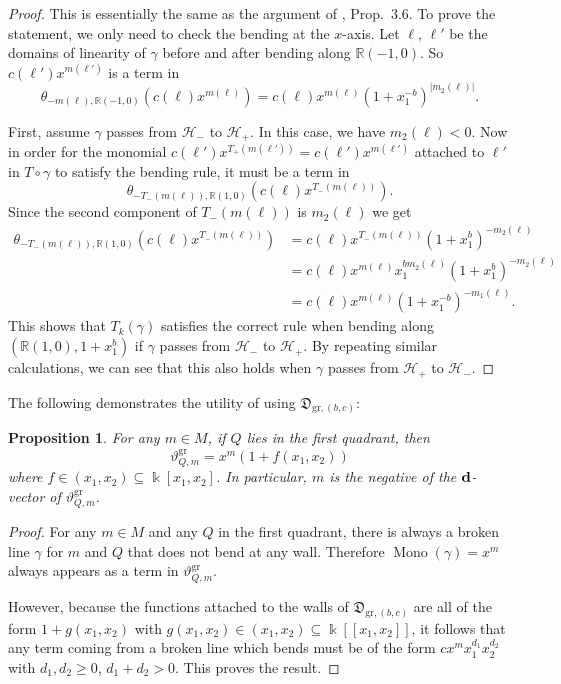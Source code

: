 \documentclass[10pt]{amsart}
\newtheorem{prop}[theorem]{Proposition}
\theoremstyle{remark}
\numberwithin{equation}{section}
\newcommand{\RR}{\mathbb{R}}
\newcommand{\fD}{\mathfrak{D}}
\newcommand{\gr}{\mathrm{gr}}
\newcommand{\Mono}{\operatorname{Mono}}
\begin{document}
\begin{proof}
  This is essentially the same as the argument of \cite{GHKK}, Prop.\ 3.6.  To
  prove the statement, we only need to check the bending at the $x$-axis. Let
  $\ell$, $\ell'$ be the domains of linearity of $\gamma$ before and after bending
  along $\RR (-1,0)$. So $c(\ell') x^{m(\ell')}$ is a term in 
  \[
    \theta_{-m(\ell),\RR(-1,0)} \left(c(\ell) x^{m(\ell)}\right)
    = 
    c(\ell) x^{m(\ell)} \left(1+x_1^{-b}\right) ^{|m_2(\ell)|}.
  \]

  First, assume $\gamma$ passes from $\mathcal{H}_-$ to $\mathcal{H}_+$. In this
  case, we have $m_2(\ell) < 0$. Now in order for the monomial
  $c(\ell')x^{T_+(m(\ell'))} =c(\ell')x^{m(\ell')}$ attached to $\ell'$ in
  $T\circ\gamma$ to satisfy the bending rule, it must be a term in
  \[
    \theta_{-T_-(m(\ell)),\RR (1,0)} \left(c(\ell) x^{T_-(m(\ell))}\right). 
  \]
  Since the second component of $T_-(m(\ell))$ is $m_2(\ell)$ we get
  \begin{align*} 
    \theta_{-T_-(m(\ell)),\RR (1,0)} \left(c(\ell) x^{T_-(m(\ell))}\right) 
    & =
    c(\ell) x^{T_-(m(\ell))} \left(1+x_1^b\right) ^{-m_2(\ell)}
    \\
    & = 
    c(\ell) x^{m(\ell)} x_1^{b m_2(\ell)} 
    \left(1+x_1^b\right)^{-m_2(\ell)} 
    \\
    & = 
    c(\ell) x^{m(\ell)} \left(1+x_1^{-b}\right) ^{-m_1(\ell)}.
  \end{align*}
  This shows that $T_k(\gamma)$ satisfies the correct rule when bending along
  $(\RR (1,0), 1+x_1^b)$ if $\gamma$ passes from $\mathcal{H}_-$ to
  $\mathcal{H}_+$. By repeating similar calculations, we can see that this also
  holds when $\gamma$ passes from $\mathcal{H}_+$ to $\mathcal{H}_-$.
\end{proof}

The following demonstrates the utility of using $\fD_{\gr,(b,c)}$:

\begin{prop}
  For any  $m\in M$, if $Q$ lies in the first quadrant, then 
  \[
    \vartheta^{\gr}_{Q, m}=x^{m}\left(1+f(x_1,x_2)\right)
  \]
  where $f\in (x_1,x_2)\subseteq \Bbbk[x_1,x_2]$.
  In particular, $m$ is the negative of the ${\bf d}$-vector of
  $\vartheta^{\gr}_{Q,m}$.
\end{prop}

\begin{proof}
  For any $m\in M$ and any $Q$ in the first quadrant, there is always a broken
  line $\gamma$ for $m$ and $Q$ that does not bend at any wall. Therefore $\Mono
  (\gamma) = x^{m}$ always appears as a term in $\vartheta^{\gr}_{Q,m}$.

  However, because the functions attached to the walls of
  $\fD_{\gr,(b,c)}$ are all of the form $1+g(x_1,x_2)$ with $g(x_1,x_2) \in
  (x_1,x_2) \subseteq \Bbbk[[x_1,x_2]]$, it follows that any term coming from a
  broken line which bends must be of the form $cx^{m}x_1^{d_1}x_2^{d_2}$ with
  $d_1,d_2\ge 0$, $d_1+d_2>0$. This proves the result.
\end{proof}
\end{document}
